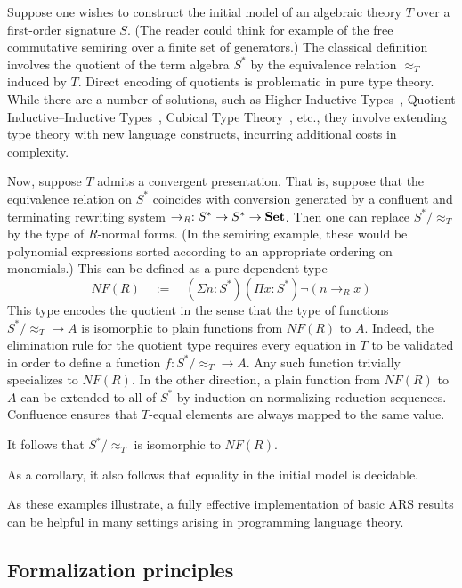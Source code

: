 \begin{example}
Suppose one wishes to construct the initial model of an algebraic theory $T$
over a first-order signature $S$.
(The reader could think for example of the free commutative semiring over a finite set of generators.)
The classical definition involves the quotient of the term algebra $S^*$ by
the equivalence relation $\approx_T$ induced by $T$.
Direct encoding of quotients is problematic in pure type theory.
While there are a number of solutions, such as Higher Inductive Types~\cite{HoTT},
Quotient Inductive--Inductive Types~\cite{QIIT}, Cubical Type Theory~\cite{CTT}, etc.,
they involve extending type theory with new language constructs,
incurring additional costs in complexity.

Now, suppose $T$ admits a convergent presentation.
That is, suppose that the equivalence relation on $S^*$ coincides
with conversion generated by a confluent and terminating rewriting system
$\to_R : S^* \to S^* \to \mathbf{Set}$.
Then one can replace $S^*/{\approx_T}$ by the type of $R$-normal forms.
(In the semiring example, these would be polynomial expressions sorted according to
an appropriate ordering on monomials.)
This can be defined as a pure dependent type
\[ NF(R) \quad := \quad (\Sigma n : S^*) (\Pi x : S^*) \lnot (n \to_R x) \]
This type encodes the quotient in the sense that the type of functions $S^*/{\approx_T} \to A$ is isomorphic to plain functions from $NF(R)$ to $A$.
Indeed, the elimination rule for the quotient type requires every equation in $T$
to be validated in order to define a function $f : S^*/{\approx_T} \to A$.
Any such function trivially specializes to $NF(R)$.  In the other direction,
a plain function from $NF(R)$ to $A$
can be extended to all of $S^*$ by induction on normalizing reduction sequences.
Confluence ensures that $T$-equal elements are always mapped to the same value.

It follows that $S^*/{\approx_T}$ is isomorphic to $NF(R)$.

As a corollary, it also follows that equality in the initial model is decidable.
\end{example}

As these examples illustrate, a fully effective implementation of basic ARS results
can be helpful in many settings arising in programming language theory.

\subsection{Formalization principles}

